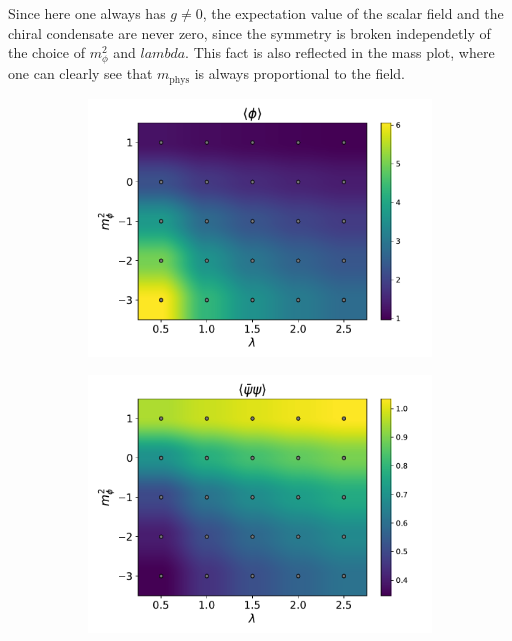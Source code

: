 Since here one always has $g \neq 0$, the expectation value of the scalar field and the chiral condensate are never zero, since the symmetry is broken independetly of the choice of $m_\phi^2$ and $lambda$. This fact is also reflected in the mass plot,
where one can clearly see that $m_\text{phys}$ is always proportional to the field.
\begin{figure}[hbp]
    \centering
    \begin{subfigure}[b]{0.48\textwidth}
        \includegraphics[width=\textwidth]{figures/phase_diagram/m-lam/phase_diagram_phi.pdf}
    \end{subfigure}
    \begin{subfigure}[b]{0.48\textwidth}
        \includegraphics[width=\textwidth]{figures/phase_diagram/m-lam/phase_diagram_cond.pdf}

\end{subfigure}
\end{figure}
